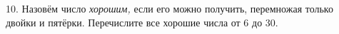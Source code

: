 10. Назовём число {\it хорошим,} если его можно получить, перемножая только двойки и пятёрки. Перечислите все хорошие числа от 6 до 30.\\
